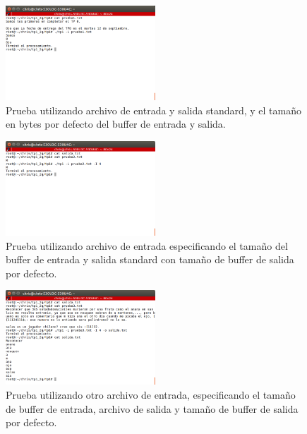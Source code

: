 \documentclass[a4paper]{article}
\begin{document}
\begin{figure}[!htp]
\begin{center}
\includegraphics[width=0.5\textwidth]{imagenes_casosDePrueba_tp1/prueba_1archivoDeEntrada.png}
\caption{Prueba utilizando archivo de entrada y salida standard, y el tamaño en bytes por defecto del buffer de entrada y salida.} \label{fig001}
\end{center}
\end{figure}

\begin{figure}[!htp]
\begin{center}
\includegraphics[width=0.5\textwidth]{imagenes_casosDePrueba_tp1/prueba2_entrada_4.png}
\caption{Prueba utilizando archivo de entrada especificando el tamaño del buffer de entrada y salida standard con tamaño de buffer de salida por defecto.} \label{fig001}
\end{center}
\end{figure}

\begin{figure}[!htp]
\begin{center}
\includegraphics[width=0.5\textwidth]{imagenes_casosDePrueba_tp1/prueba3_archivoEntrada_4_salida_default.png}
\caption{Prueba utilizando otro archivo de entrada, especificando el tamaño de buffer de entrada, archivo de salida y tamaño de buffer de salida por defecto.} \label{fig001}
\end{center}
\end{figure}
\end{document}
